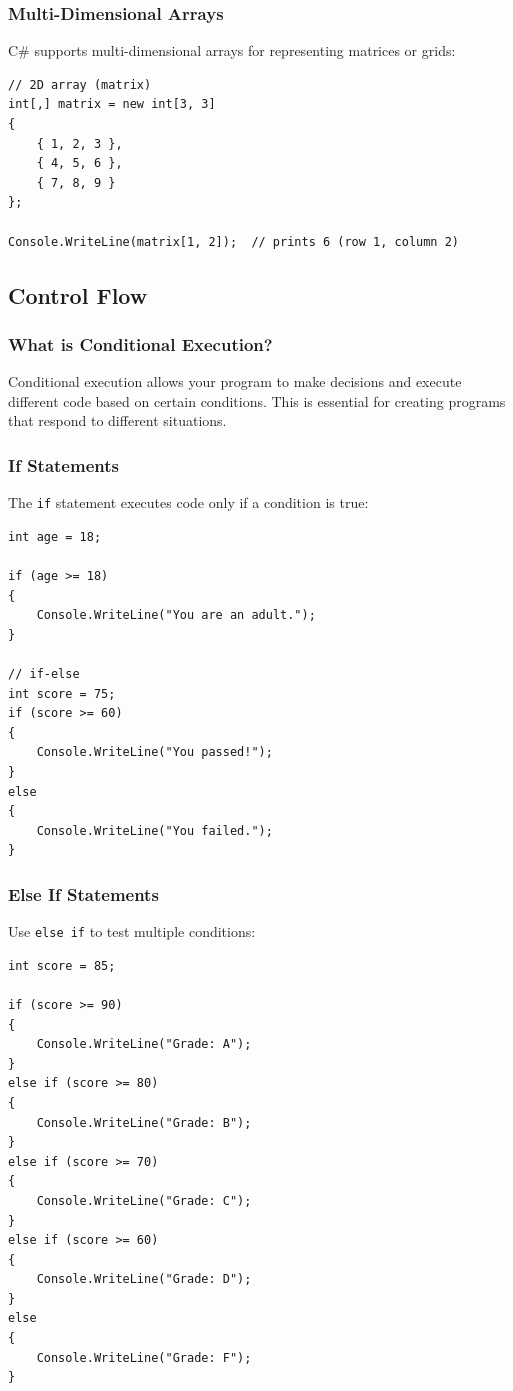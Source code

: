 \documentclass{article}
\begin{document}
\subsubsection{Multi-Dimensional Arrays}
C\# supports multi-dimensional arrays for representing matrices or grids:
\begin{verbatim}
// 2D array (matrix)
int[,] matrix = new int[3, 3]
{
    { 1, 2, 3 },
    { 4, 5, 6 },
    { 7, 8, 9 }
};

Console.WriteLine(matrix[1, 2]);  // prints 6 (row 1, column 2)
\end{verbatim}

\subsection{Control Flow}

\subsubsection{What is Conditional Execution?}
Conditional execution allows your program to make decisions and execute different code based on certain conditions. This is essential for creating programs that respond to different situations.

\subsubsection{If Statements}
The \texttt{if} statement executes code only if a condition is true:

\begin{verbatim}
int age = 18;

if (age >= 18)
{
    Console.WriteLine("You are an adult.");
}

// if-else
int score = 75;
if (score >= 60)
{
    Console.WriteLine("You passed!");
}
else
{
    Console.WriteLine("You failed.");
}
\end{verbatim}

\subsubsection{Else If Statements}
Use \texttt{else if} to test multiple conditions:

\begin{verbatim}
int score = 85;

if (score >= 90)
{
    Console.WriteLine("Grade: A");
}
else if (score >= 80)
{
    Console.WriteLine("Grade: B");
}
else if (score >= 70)
{
    Console.WriteLine("Grade: C");
}
else if (score >= 60)
{
    Console.WriteLine("Grade: D");
}
else
{
    Console.WriteLine("Grade: F");
}
\end{verbatim}
\end{document}
